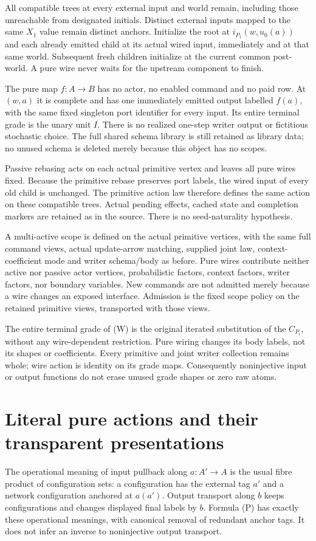 \documentclass[11pt]{article}
\begin{document}
All compatible trees at every external input and world remain, including those unreachable from designated initials. Distinct external inputs mapped to the same $X_1$ value remain distinct anchors. Initialize the root at $i_{P_1}(w,u_0(a))$ and each already emitted child at its actual wired input, immediately and at that same world. Subsequent fresh children initialize at the current common post-world. A pure wire never waits for the upstream component to finish.

The pure map $f:A\to B$ has no actor, no enabled command and no paid row. At $(w,a)$ it is complete and has one immediately emitted output labelled $f(a)$, with the same fixed singleton port identifier for every input. Its entire terminal grade is the unary unit $I$. There is no realized one-step writer output or fictitious stochastic choice. The full shared schema library is still retained as library data; no unused schema is deleted merely because this object has no scopes.

Passive rebasing acts on each actual primitive vertex and leaves all pure wires fixed. Because the primitive rebase preserves port labels, the wired input of every old child is unchanged. The primitive action law therefore defines the same action on these compatible trees. Actual pending effects, cached state and completion markers are retained as in the source. There is no seed-naturality hypothesis.

A multi-active scope is defined on the actual primitive vertices, with the same full command views, actual update-arrow matching, supplied joint law, context-coefficient mode and writer schema/body as before. Pure wires contribute neither active nor passive actor vertices, probabilistic factors, context factors, writer factors, nor boundary variables. New commands are not admitted merely because a wire changes an exposed interface. Admission is the fixed scope policy on the retained primitive views, transported with those views.

The entire terminal grade of (W) is the original iterated substitution of the $C_{P_i}$, without any wire-dependent restriction. Pure wiring changes its body labels, not its shapes or coefficients. Every primitive and joint writer collection remains whole; wire action is identity on its grade maps. Consequently noninjective input or output functions do not erase unused grade shapes or zero raw atoms.

\section{Literal pure actions and their transparent presentations}
The operational meaning of input pullback along $a:A'\to A$ is the usual fibre product of configuration sets: a configuration has the external tag $a'$ and a network configuration anchored at $a(a')$. Output transport along $b$ keeps configurations and changes displayed final labels by $b$. Formula (P) has exactly these operational meanings, with canonical removal of redundant anchor tags. It does not infer an inverse to noninjective output transport.
\end{document}
